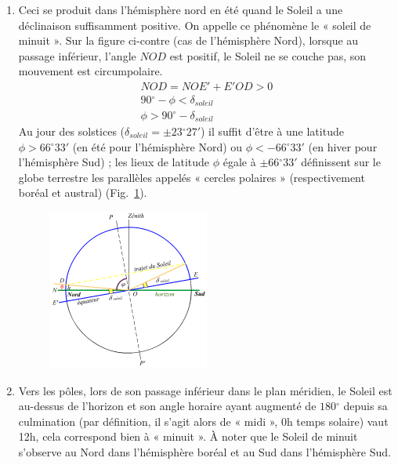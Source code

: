 \documentclass[a4paper,10pt]{report}
\renewcommand{\deg}{\ensuremath{^{\circ}}}
\begin{document}
\begin{Answer}
\begin{enumerate}
  \item Ceci se produit dans l'hémisphère nord en été quand le Soleil
    a une déclinaison suffisamment positive. On appelle ce phénomène
    le « soleil de minuit ». Sur la figure ci-contre (cas de
    l'hémisphère Nord), lorsque au passage inférieur, l'angle $NOD$
    est positif, le Soleil ne se couche pas, son mouvement est
    circumpolaire.
    \begin{eqnarray*}
      NOD = NOE' + E'OD > 0 \\
      90\deg - \phi < \delta_{soleil} \\
      \phi > 90\deg - \delta_{soleil}
    \end{eqnarray*}
    Au jour des solstices ($\delta_{soleil} = \pm 23\deg27'$) il
    suffit d'être à une latitude $\phi > 66\deg33'$ (en été pour
    l'hémisphère Nord) ou $\phi < - 66\deg33'$ (en hiver pour
    l'hémisphère Sud) ; les lieux de latitude $\phi$ égale à $\pm
    66\deg33'$ définissent sur le globe terrestre les parallèles
    appelés « cercles polaires » (respectivement boréal et austral)
    (Fig.~\ref{mvtsolaire2}).

    \begin{figure}[htp]
      \centering
      \includegraphics[width=0.5\textwidth]{mvt_soleil2}
      \label{mvtsolaire2}
      \caption{}
    \end{figure}

  \item Vers les pôles, lors de son passage inférieur dans le plan
    méridien, le Soleil est au-dessus de l'horizon et son angle
    horaire ayant augmenté de $180\deg$ depuis sa culmination (par
    définition, il s'agit alors de « midi », 0h temps solaire) vaut
    12h, cela correspond bien à « minuit ». À noter que le Soleil de
    minuit s'observe au Nord dans l'hémisphère boréal et au Sud dans
    l'hémisphère Sud.


\end{enumerate}
\end{Answer}
\end{document}
